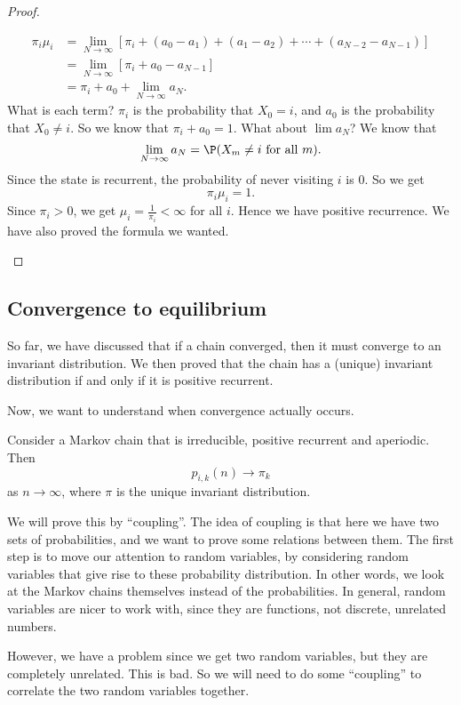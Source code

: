 \documentclass[a4paper]{article}
\begin{document}
\begin{proof}
\begin{enumerate}
\begin{align*}
        \pi_i \mu_i &= \lim_{N \to \infty} [\pi_i + (a_0 - a_1) + (a_1 - a_2) + \cdots + (a_{N - 2} - a_{N - 1})]\\
        &= \lim_{N\to \infty} [\pi_i + a_0 - a_{N - 1}]\\
        &= \pi_i + a_0 + \lim_{N \to \infty} a_N.
      \end{align*}
      What is each term? $\pi_i$ is the probability that $X_0 = i$, and $a_0$ is the probability that $X_0 \not= i$. So we know that $\pi_i + a_0 = 1$. What about $\lim a_N$? We know that
      \[
        \lim_{N\to \infty} a_N = \P(X_m \not= i \text{ for all }m).
      \]
      Since the state is recurrent, the probability of never visiting $i$ is $0$. So we get
      \[
        \pi_i \mu_i = 1.
      \]
      Since $\pi_i > 0$, we get $\mu_i = \frac{1}{\pi_i} < \infty$ for all $i$. Hence we have positive recurrence. We have also proved the formula we wanted.\qedhere
  \end{enumerate}
\end{proof}
\subsection{Convergence to equilibrium}
So far, we have discussed that if a chain converged, then it must converge to an invariant distribution. We then proved that the chain has a (unique) invariant distribution if and only if it is positive recurrent.

Now, we want to understand when convergence actually occurs.
\begin{thm}
  Consider a Markov chain that is irreducible, positive recurrent and aperiodic. Then
  \[
    p_{i,k}(n) \to \pi_k
  \]
  as $n \to \infty$, where $\pi$ is the unique invariant distribution.
\end{thm}
We will prove this by ``coupling''. The idea of coupling is that here we have two sets of probabilities, and we want to prove some relations between them. The first step is to move our attention to random variables, by considering random variables that give rise to these probability distribution. In other words, we look at the Markov chains themselves instead of the probabilities. In general, random variables are nicer to work with, since they are functions, not discrete, unrelated numbers.

However, we have a problem since we get two random variables, but they are completely unrelated. This is bad. So we will need to do some ``coupling'' to correlate the two random variables together.
\end{document}
